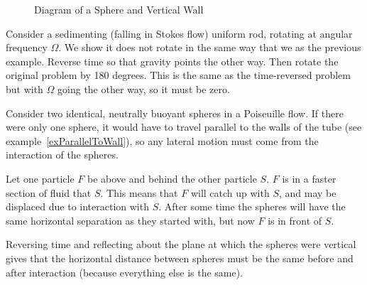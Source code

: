 \documentclass[../Main.tex]{subfiles}
\begin{document}
\begin{figure}
    \centering
    \caption{Diagram of a Sphere and Vertical Wall}
    \label{figSphereFalling}
\end{figure}
\begin{example}
    Consider a sedimenting (falling in Stokes flow) uniform rod, rotating at angular frequency $\Omega$. We show it does not rotate in the same way that we as the previous example. Reverse time so that gravity points the other way. Then rotate the original problem by 180 degrees. This is the same as the time-reversed problem but with $\Omega$ going the other way, so it must be zero.
\end{example}
\begin{example}
    Consider two identical, neutrally buoyant spheres in a Poiseuille flow. If there were only one sphere, it would have to travel parallel to the walls of the tube (see example~\ref{exParallelToWall}), so any lateral motion must come from the interaction of the spheres. 
    
    Let one particle $F$ be above and behind the other particle $S$. $F$ is in a faster section of fluid that $S$. This means that $F$ will catch up with $S$, and may be displaced due to interaction with $S$. After some time the spheres will have the same horizontal separation as they started with, but now $F$ is in front of $S$.

    Reversing time and reflecting about the plane at which the spheres were vertical gives that the horizontal distance between spheres must be the same before and after interaction (because everything else is the same).
\end{example}
\end{document}
